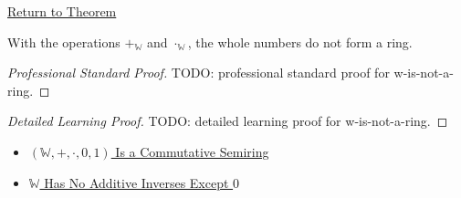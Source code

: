 \newpage
{}
\label{prf:w-is-not-a-ring}

\begin{remark*}[Return]
\hyperref[thm:w-is-not-a-ring]{Return to Theorem}
\end{remark*}

\begin{theorem*}
With the operations $+_{\mathbb{W}}$ and $\cdot_{\mathbb{W}}$, the whole
numbers do not form a ring.
\end{theorem*}

\begin{proof}[Professional Standard Proof]
\LRAProofBodyStart
TODO: professional standard proof for w-is-not-a-ring.
\end{proof}

\begin{proof}[Detailed Learning Proof]
\LRAProofBodyStart
TODO: detailed learning proof for w-is-not-a-ring.
\end{proof}

\begin{remark*}
\end{remark*}

\begin{dependencies}
\begin{itemize}
  \item \hyperref[thm:w-commutative-semiring]{$(\mathbb{W},+,\cdot,0,1)$ Is a Commutative Semiring}
  \item \hyperref[thm:w-has-no-additive-inverses-except-zero]{$\mathbb{W}$ Has No Additive Inverses Except $0$}
\end{itemize}
\end{dependencies}

\clearpage
